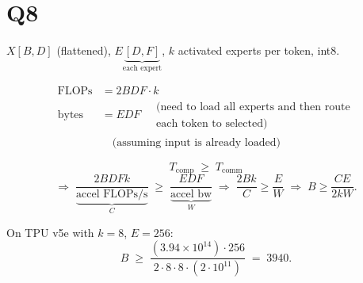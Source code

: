 \documentclass[11pt]{article}
\newcommand{\flops}{\text{FLOPs}}
\newcommand{\flopss}{\text{FLOPs/s}}
\newcommand{\Tcomm}{T_{\text{comm}}}
\newcommand{\Tcomp}{T_{\text{comp}}}
\begin{document}
\section*{Q8}

$X[B, D]$ (flattened), $E\underbrace{[D, F]}_{\text{each expert}}$, $k$ activated experts per token, int8.

\begin{align*}
\flops &= 2BDF \cdot k \\
\text{bytes} &= EDF \quad \substack{\text{(need to load all experts and then route} \\ \text{each token to selected)}} \\
&\quad \text{(assuming input is already loaded)}
\end{align*}

\[
\Tcomp \;\geq\; \Tcomm
\]
\[
\Rightarrow\; \frac{2BDFk}{\underbrace{\text{accel }\flopss}_{C}} \;\geq\; \frac{EDF}{\underbrace{\text{accel bw}}_{W}}
\;\Rightarrow\; \frac{2Bk}{C} \geq \frac{E}{W}
\;\Rightarrow\; B \geq \frac{CE}{2kW}.
\]

On TPU v5e with $k = 8$, $E = 256$:
\[
B \;\geq\; \frac{(3.94 \times 10^{14}) \cdot 256}{2 \cdot 8 \cdot 8 \cdot (2 \cdot 10^{11})} \;=\; 3940.
\]
\end{document}
